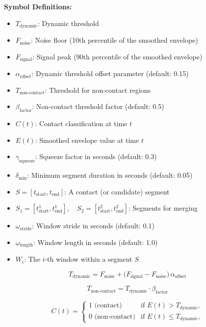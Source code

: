 \textbf{Symbol Definitions:}
\begin{itemize}
    \item $T_{\text{dynamic}}$: Dynamic threshold
    \item $F_{\text{noise}}$: Noise floor (10th percentile of the smoothed envelope)
    \item $F_{\text{signal}}$: Signal peak (90th percentile of the smoothed envelope)
    \item $\alpha_{\text{offset}}$: Dynamic threshold offset parameter (default: 0.15)
    \item $T_{\text{non-contact}}$: Threshold for non-contact regions
    \item $\beta_{\text{factor}}$: Non-contact threshold factor (default: 0.5)
    \item $C(t)$: Contact classification at time $t$
    \item $E(t)$: Smoothed envelope value at time $t$
    \item $\gamma_{\text{squeeze}}$: Squeeze factor in seconds (default: 0.3)
    \item $\delta_{\min}$: Minimum segment duration in seconds (default: 0.05)
    \item $S = [t_{\text{start}}, t_{\text{end}}]$: A contact (or candidate) segment
    \item $S_1 = [t_{\text{start}}^1, t_{\text{end}}^1], \quad S_2 = [t_{\text{start}}^2, t_{\text{end}}^2]$: Segments for merging
    \item $\omega_{\text{stride}}$: Window stride in seconds (default: 0.1)
    \item $\omega_{\text{length}}$: Window length in seconds (default: 1.0)
    \item $W_i$: The $i$-th window within a segment $S$
\end{itemize}


\[
T_{\text{dynamic}}
= F_{\text{noise}}
+ \bigl(F_{\text{signal}} - F_{\text{noise}}\bigr)\,\alpha_{\text{offset}}
\]

\[
T_{\text{non-contact}}
= T_{\text{dynamic}} \cdot \beta_{\text{factor}}
\]

\[
C(t)
=
\begin{cases}
1 \text{ (contact)} & \text{if } E(t) > T_{\text{dynamic}},\\
0 \text{ (non-contact)} & \text{if } E(t) \leq T_{\text{dynamic}},
\end{cases}
\]

